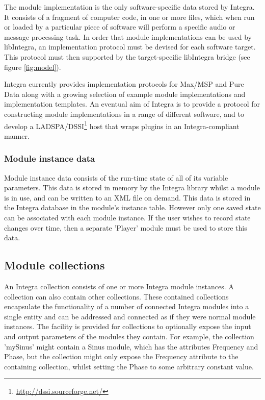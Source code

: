 \documentclass{article}
\begin{document}
The module implementation is the only software-specific data stored by Integra. It consists of a fragment of computer code, in one or more files, which when run or loaded by a particular piece of software will perform a specific audio or message processing task. In order that module implementations can be used by libIntegra, an implementation protocol must be devised for each software target. This protocol must then supported by the target-specific libIntegra bridge (see figure \ref{fig:model}).

Integra currently provides implementation protocols for Max/MSP and Pure Data along with a growing selection of example module implementations and implementation templates. An eventual aim of Integra is to provide a protocol for constructing module implementations in a range of different software, and to develop a LADSPA/DSSI\footnote{\url{http://dssi.sourceforge.net/}} host that wraps plugins in an Integra-compliant manner.

\subsubsection{Module instance data}\label{subsubsec:module_instance_data} 

Module instance data consists of the run-time state of all of its variable parameters. This data is stored in memory by the Integra library whilst a module is in use, and can be written to an XML file on demand. This data is stored in the Integra database in the module's instance table. However only one saved state can be associated with each module instance. If the user wishes to record state changes over time, then a separate 'Player' module must be used to store this data.

\subsection{Module collections}\label{subsec:module_collections}

An Integra collection consists of one or more Integra module instances. A collection can also contain other collections. These contained collections encapsulate the functionality of a number of connected Integra modules into a single entity and can be addressed and connected as if they were normal module instances. The facility is provided for collections to optionally expose the input and output parameters of the modules they contain. For example, the collection 'mySinus' might contain a Sinus module, which has the attributes Frequency and Phase, but the collection might only expose the Frequency attribute to the containing collection, whilst setting the Phase to some arbitrary constant value.
\end{document}
